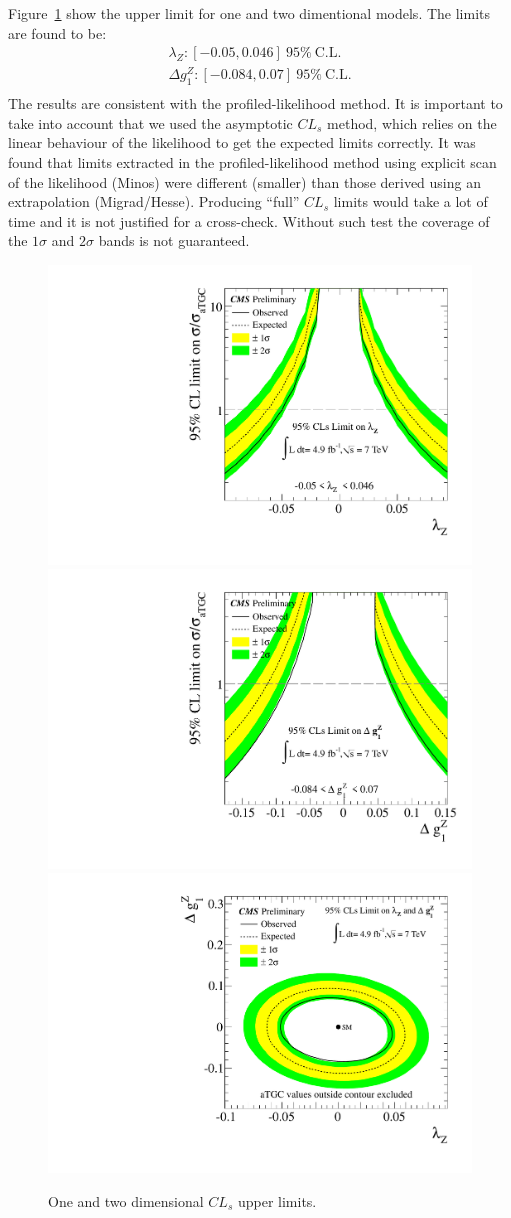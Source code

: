 Figure~\ref{fig:cls} show the upper limit for one
and two dimentional models. The limits are found to be:
\begin{align}
  \lambda_{Z}: [-0.05,0.046]~95\%~\mathrm{C.L.}\\ 
  \Delta g^{Z}_1: [-0.084,0.07]~95\%~\mathrm{C.L.}\\
\end{align}
The results are consistent with the profiled-likelihood method. It is
important to take into account that we used the asymptotic $CL_{s}$
method, which relies on the linear behaviour of the likelihood to get
the expected limits correctly. It was found that limits extracted in
the profiled-likelihood method using explicit scan of the likelihood
(Minos) were different (smaller) than those derived using an
extrapolation (Migrad/Hesse). Producing ``full'' $CL_{s}$ limits would
take a lot of time and it is not justified for a cross-check. Without
such test the coverage of the $1\sigma$ and $2\sigma$ bands is not
guaranteed.

\begin{figure}[!hbtp]
\centering
\includegraphics[width=.45\textwidth]{figures/lz_cls.pdf}
\includegraphics[width=.45\textwidth]{figures/dgz_cls.pdf}
\includegraphics[width=.45\textwidth]{figures/lz_dgz_cls.pdf}
\caption{One and two dimensional $CL_{s}$ upper limits.}
\label{fig:cls}
\end{figure}
